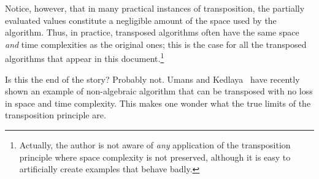 Notice, however, that in many practical instances of transposition,
the partially evaluated values constitute a negligible amount of the
space used by the algorithm. Thus, in practice, transposed algorithms
often have the same space \emph{and} time complexities as the original
ones; this is the case for all the transposed algorithms that appear
in this document.\footnote{Actually, the author is not aware of
  \emph{any} application of the transposition principle where space
  complexity is not preserved, although it is easy to artificially
  create examples that behave badly.}

\begin{nota}
  Is this the end of the story? Probably not. Umans and
  Kedlaya~\cite{kedlaya+umans08} have recently shown an example of
  non-algebraic algorithm that can be transposed with no loss in space
  and time complexity. This makes one wonder what the true limits of
  the transposition principle are.
\end{nota}



